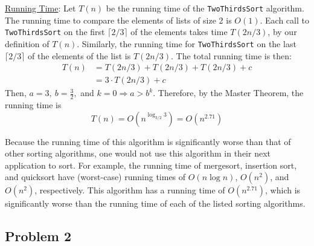 \documentclass[twoside,11pt]{homework}
\begin{document}
\noindent
\underline{Running Time}:  Let $T(n)$ be the running time of the \texttt{TwoThirdsSort} algorithm.  The running time to compare the elements of lists of size 2 is $O(1)$.   Each call to \texttt{TwoThirdsSort} on the first $\lceil 2/3 \rceil$ of the elements takes time $T(2n/3)$, by our definition of $T(n)$.  Similarly, the running time for \texttt{TwoThirdsSort} on the last $\lceil 2/3 \rceil$ of the elements of the list is $T(2n/3)$.  The total running time is then: 
\begin{align*}
T(n) & = T(2n/3) + T(2n/3) + T(2n/3) + c \\
& = 3 \cdot T(2n/3) + c 
\end{align*}
Then, $a=3,  \ b= \frac{3}{2},$ and $k= 0  \Longrightarrow a>b^k$. Therefore, by the Master Theorem, the running time is $$T(n) = O(n^{\log_{3/2}3}) = O(n^{2.71})$$

\noindent
Because the running time of this algorithm is significantly worse than that of other sorting algorithms, one would not use this algorithm in their next application to sort.  For example,  the running time of mergesort,  insertion sort, and quicksort have (worst-case) running times of $O(n \log n)$,  $O(n^2)$,  and $O(n^2)$, respectively.  This algorithm has a running time of $O(n^{2.71})$, which is significantly worse than the running time of each of the listed sorting algorithms.  





\subsection*{Problem 2}
\end{document}
